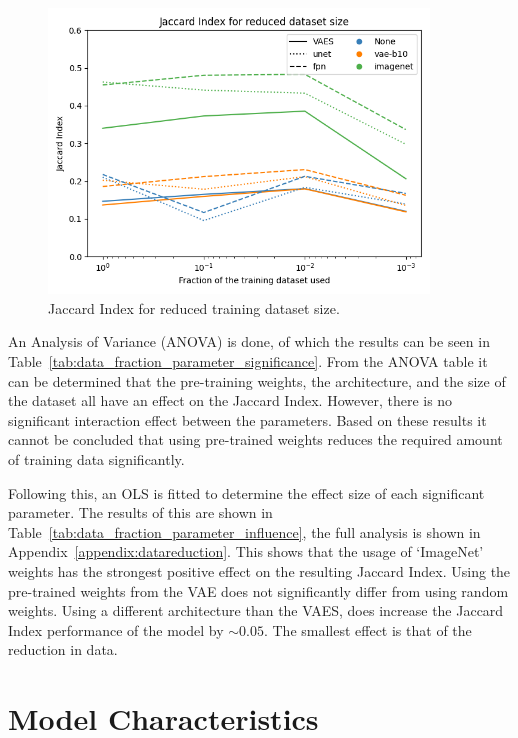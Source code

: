 \begin{figure}[h]
    \centering
    \includegraphics[width=0.9\textwidth]{figures/data_percentage/line-plot.png}
    \caption{Jaccard Index for reduced training dataset size.}
    \label{fig:dataset-fraction-results}
\end{figure}

An Analysis of Variance (ANOVA) is done, of which the results can be seen in Table~\ref{tab:data_fraction_parameter_significance}. From the ANOVA table it can be determined that the pre-training weights, the architecture, and the size of the dataset all have an effect on the Jaccard Index. However, there is no significant interaction effect between the parameters. Based on these results it cannot be concluded that using pre-trained weights reduces the required amount of training data significantly.

Following this, an OLS is fitted to determine the effect size of each significant parameter. The results of this are shown in Table~\ref{tab:data_fraction_parameter_influence}, the full analysis is shown in Appendix~\ref{appendix:datareduction}. This shows that the usage of `ImageNet' weights has the strongest positive effect on the resulting Jaccard Index. Using the pre-trained weights from the VAE does not significantly differ from using random weights. Using a different architecture than the VAES, does increase the Jaccard Index performance of the model by $\sim0.05$. The smallest effect is that of the reduction in data.



\section{Model Characteristics}

